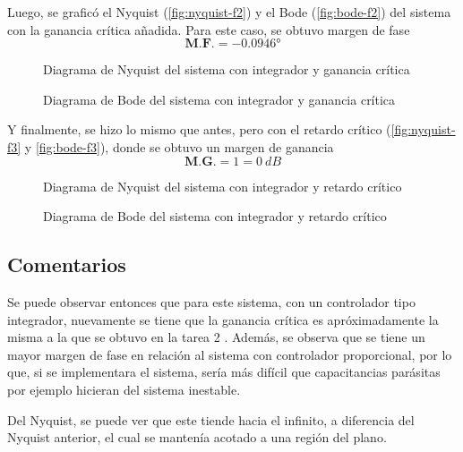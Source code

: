 Luego, se graficó el Nyquist (\autoref{fig:nyquist-f2}) y el Bode (\autoref{fig:bode-f2})
del sistema con la ganancia crítica añadida. Para este caso, se obtuvo margen de fase
\begin{equation}
  \boxed{\textbf{M.F.} = \ang{-0.0946}}
\end{equation}

\begin{figure}[h]
  \centering
  
  \caption{Diagrama de Nyquist del sistema con integrador y ganancia crítica}
  \label{fig:nyquist-f2}
\end{figure}

\begin{figure}[h]
  \centering
  
  \caption{Diagrama de Bode del sistema con integrador y ganancia crítica}
  \label{fig:bode-f2}
\end{figure}

Y finalmente, se hizo lo mismo que antes, pero con el retardo crítico (\autoref{fig:nyquist-f3}
y \autoref{fig:bode-f3}), donde se obtuvo un margen de ganancia
\begin{equation}
  \boxed{\textbf{M.G.} = 1 = 0\ \unit{dB}}
\end{equation}

\begin{figure}[h]
  \centering
  
  \caption{Diagrama de Nyquist del sistema con integrador y retardo crítico}
  \label{fig:nyquist-f3}
\end{figure}

\begin{figure}[h]
  \centering
  
  \caption{Diagrama de Bode del sistema con integrador y retardo crítico}
  \label{fig:bode-f3}
\end{figure}

\FloatBarrier
\subsection{Comentarios}

Se puede observar entonces que para este sistema, con un controlador tipo integrador,
nuevamente se tiene que la ganancia crítica es apróximadamente la misma a la que se
obtuvo en la tarea 2 \cite{tarea-2-sdc}. Además, se observa que se tiene un mayor
margen de fase en relación al sistema con controlador proporcional, por lo que, si
se implementara el sistema, sería más difícil que capacitancias parásitas por ejemplo
hicieran del sistema inestable.

Del Nyquist, se puede ver que este tiende hacia el infinito, a diferencia del Nyquist
anterior, el cual se mantenía acotado a una región del plano.


